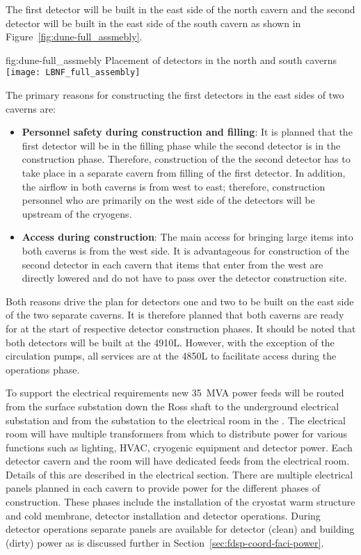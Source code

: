 The first detector will be built in the east side of the north cavern and
the second detector will be built in the east side of the south cavern as
shown in Figure~\ref{fig:dune-full_assmebly}.
\begin{dunefigure}{fig:dune-full_assmebly}
  {Placement of detectors in the north and south caverns}
  \texttt{[image: LBNF\_full\_assembly]}
\end{dunefigure}
The primary reasons for constructing the first detectors in the east
sides of two caverns are:
\begin{itemize}
\item {\bf Personnel safety during construction and filling}: It is
  planned that the first detector will be in the filling phase while the second detector
  is in the construction phase. Therefore, construction of the the
  second detector has to take place in a separate cavern from
  filling of the first detector. In addition, the airflow in both
  caverns is from west to east; therefore, construction
  personnel who are primarily on the west side of the detectors will
  be upstream of the cryogens.
\item{\bf Access during construction}: The main access for bringing
  large items into both caverns is from the west side. It is
  advantageous for construction of the second detector in each cavern
  that items that enter from the west are directly lowered and do not
  have to pass over the detector construction site.
\end{itemize}
Both reasons drive the plan for detectors one and two to be built on
the east side of the two separate caverns.  It is therefore planned
that both caverns are ready for  at the start of respective
detector construction phases.  It should be noted that both detectors
will be built at the 4910L. However, with the exception of the
 circulation pumps, all services are at the 4850L to
facilitate access during the operations phase.

To support the electrical requirements new 35~MVA power feeds will be
routed from the surface substation down the Ross shaft to the
underground electrical substation and from the substation to the
electrical room in the .  The electrical room will have
multiple transformers from which to distribute power for various
functions such as lighting, HVAC, cryogenic equipment and detector
power.  Each detector cavern and the  room will have
dedicated feeds from the electrical room.  Details of this are
described in the electrical section.  There are multiple electrical
panels planned in each cavern to provide power for the different
phases of construction.  These phases include the installation
of the cryostat warm structure and cold membrane, detector
installation and detector operations. During detector operations
separate panels are available for detector (clean) and building
(dirty) power as is discussed further in
Section~\ref{sec:fdsp-coord-faci-power}.

